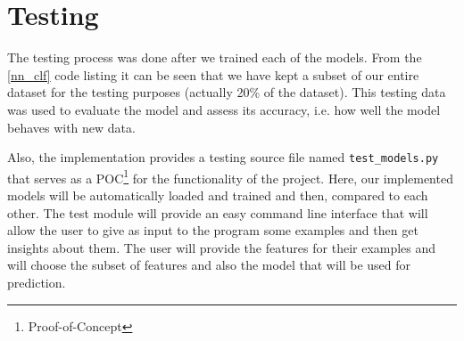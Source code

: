 

\section{Testing}

The testing process was done after we trained each of the models. From the 
\ref{nn_clf} code listing it can be seen that we have kept a subset of our entire 
dataset for the testing purposes (actually 20\% of the dataset). This testing 
data was used to evaluate the model and assess its accuracy, i.e. how well the 
model behaves with new data. 

Also, the implementation provides a testing source file named 
\texttt{test\_models.py} that serves as a POC\footnote{Proof-of-Concept} for 
the functionality of the project. Here, our implemented models will be 
automatically loaded and trained and then, compared to each other. The test module 
will provide an easy command line interface that will 
allow the user to give as input to the program some examples and then 
get insights about them. The user will provide the features for their examples 
and will choose the subset of features and also the model that will be used for 
prediction. 
